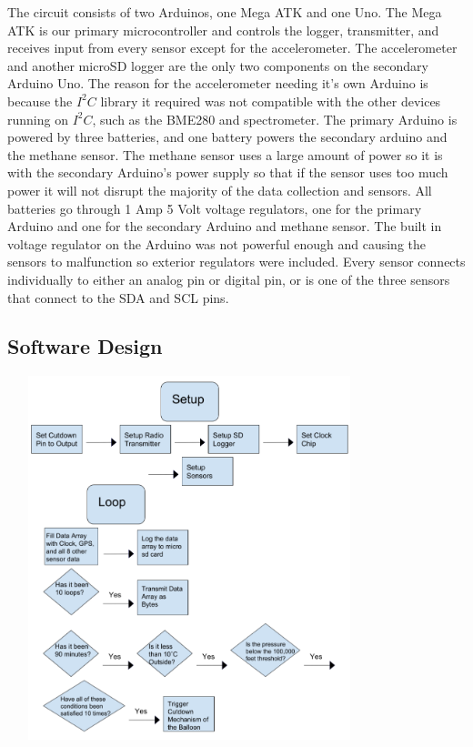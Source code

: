 \documentclass[12pt,]{article}
\begin{document}
The circuit consists of two Arduinos, one Mega ATK and one Uno. The Mega
ATK is our primary microcontroller and controls the logger, transmitter,
and receives input from every sensor except for the accelerometer. The
accelerometer and another microSD logger are the only two components on
the secondary Arduino Uno. The reason for the accelerometer needing it's
own Arduino is because the \(I^2C\) library it required was not
compatible with the other devices running on \(I^2C\), such as the
BME280 and spectrometer. The primary Arduino is powered by three
batteries, and one battery powers the secondary arduino and the methane
sensor. The methane sensor uses a large amount of power so it is with
the secondary Arduino's power supply so that if the sensor uses too much
power it will not disrupt the majority of the data collection and
sensors. All batteries go through 1 Amp 5 Volt voltage regulators, one
for the primary Arduino and one for the secondary Arduino and methane
sensor. The built in voltage regulator on the Arduino was not powerful
enough and causing the sensors to malfunction so exterior regulators
were included. Every sensor connects individually to either an analog
pin or digital pin, or is one of the three sensors that connect to the
SDA and SCL pins.

\subsection{Software Design}\label{software-design}

\begin{center}\includegraphics[width=400px,height=400px]{assets/flow_code} \end{center}
\end{document}
